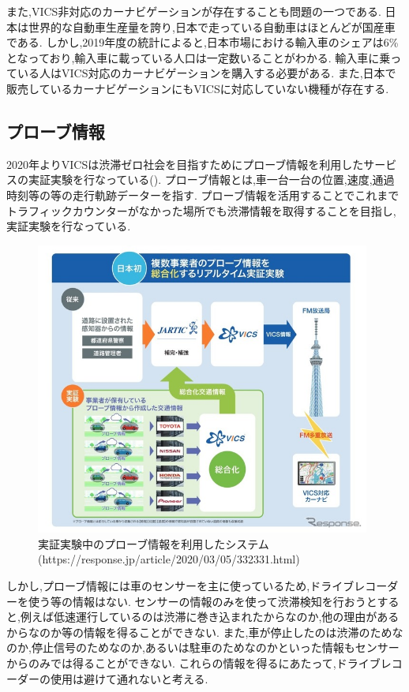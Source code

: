 また,VICS非対応のカーナビゲーションが存在することも問題の一つである.
日本は世界的な自動車生産量を誇り,日本で走っている自動車はほとんどが国産車である.
しかし,2019年度の統計によると,日本市場における輸入車のシェアは6\%となっており,輸入車に載っている人口は一定数いることがわかる.
輸入車に乗っている人はVICS対応のカーナビゲーションを購入する必要がある.
また,日本で販売しているカーナビゲーションにもVICSに対応していない機種が存在する.

\subsection{プローブ情報}
2020年よりVICSは渋滞ゼロ社会を目指すためにプローブ情報を利用したサービスの実証実験を行なっている().
プローブ情報とは,車一台一台の位置,速度,通過時刻等の等の走行軌跡データーを指す.
プローブ情報を活用することでこれまでトラフィックカウンターがなかった場所でも渋滞情報を取得することを目指し,実証実験を行なっている.

\begin{figure}[htbp]
  \begin{center}
   \includegraphics[width=11cm]{figs/probe.jpg}
  \end{center}
  \caption{実証実験中のプローブ情報を利用したシステム(https://response.jp/article/2020/03/05/332331.html)}
  \label{fig:probe}
\end{figure}

しかし,プローブ情報には車のセンサーを主に使っているため,ドライブレコーダーを使う等の情報はない.
センサーの情報のみを使って渋滞検知を行おうとすると,例えば低速運行しているのは渋滞に巻き込まれたからなのか,他の理由があるからなのか等の情報を得ることができない.
また,車が停止したのは渋滞のためなのか,停止信号のためなのか,あるいは駐車のためなのかといった情報もセンサーからのみでは得ることができない.
これらの情報を得るにあたって,ドライブレコーダーの使用は避けて通れないと考える.


